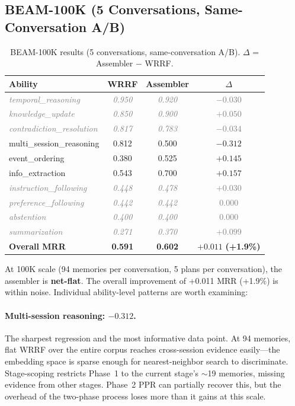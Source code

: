 \documentclass[11pt]{article}
\newcommand{\graynoise}[1]{\textcolor{gray}{\textit{#1}}}
\begin{document}
\subsection{BEAM-100K (5 Conversations, Same-Conversation A/B)}
\label{sec:results-100k}

\begin{table}[t]
\centering
\caption{BEAM-100K results (5 conversations, same-conversation A/B).
  $\Delta$ = Assembler $-$ WRRF.}
\label{tab:100k}
\begin{tabular}{lccc}
\toprule
Ability & WRRF & Assembler & $\Delta$ \\
\midrule
\graynoise{temporal\_reasoning} & \graynoise{0.950} & \graynoise{0.920} & \graynoise{$-0.030$} \\
\graynoise{knowledge\_update} & \graynoise{0.850} & \graynoise{0.900} & \graynoise{$+0.050$} \\
\graynoise{contradiction\_resolution} & \graynoise{0.817} & \graynoise{0.783} & \graynoise{$-0.034$} \\
multi\_session\_reasoning & 0.812 & 0.500 & $\mathbf{-0.312}$ \\
event\_ordering & 0.380 & 0.525 & $\mathbf{+0.145}$ \\
info\_extraction & 0.543 & 0.700 & $\mathbf{+0.157}$ \\
\graynoise{instruction\_following} & \graynoise{0.448} & \graynoise{0.478} & \graynoise{$+0.030$} \\
\graynoise{preference\_following} & \graynoise{0.442} & \graynoise{0.442} & \graynoise{$0.000$} \\
\graynoise{abstention} & \graynoise{0.400} & \graynoise{0.400} & \graynoise{$0.000$} \\
\graynoise{summarization} & \graynoise{0.271} & \graynoise{0.370} & \graynoise{$+0.099$} \\
\midrule
\textbf{Overall MRR} & \textbf{0.591} & \textbf{0.602} & $\mathbf{+0.011}$ \textbf{(+1.9\%)} \\
\bottomrule
\end{tabular}
\end{table}

At 100K scale (94 memories per conversation, 5 plans per
conversation), the assembler is \textbf{net-flat}.  The overall
improvement of +0.011 MRR (+1.9\%) is within noise.  Individual
ability-level patterns are worth examining:

\paragraph{Multi-session reasoning: $-0.312$.}
The sharpest regression and the most informative data point.  At 94
memories, flat WRRF over the entire corpus reaches cross-session
evidence easily---the embedding space is sparse enough for
nearest-neighbor search to discriminate.  Stage-scoping restricts
Phase~1 to the current stage's $\sim$19 memories, missing evidence
from other stages.  Phase~2 PPR can partially recover this, but the
overhead of the two-phase process loses more than it gains at this
scale.
\end{document}

